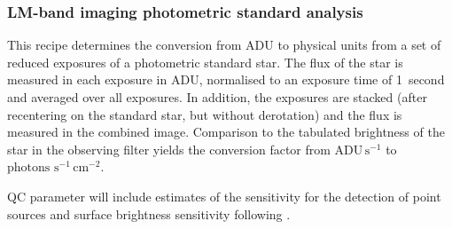 %
%
%

\subsubsection{LM-band imaging photometric standard analysis}
\label{lm_img_photstd}
\label{rec:lm_img_photstd}
\label{sssec:lm_img_photstd}

This recipe determines the conversion from ADU to physical units from
a set of reduced exposures of a photometric standard star. The flux of
the star is measured in each exposure in ADU, normalised to an
exposure time of 1~second and averaged over all exposures. In
addition, the exposures are stacked (after recentering on the standard
star, but without derotation) and the flux is measured in the combined
image. Comparison to the tabulated brightness of the star in the
observing filter yields the conversion factor from
$\mathrm{ADU\,s^{-1}}$ to $\mathrm{photons\,\,s^{-1}\,cm^{-2}}$.

QC parameter will include estimates of the sensitivity for the
detection of point sources and surface brightness sensitivity
following \cite{visir_manual}.


